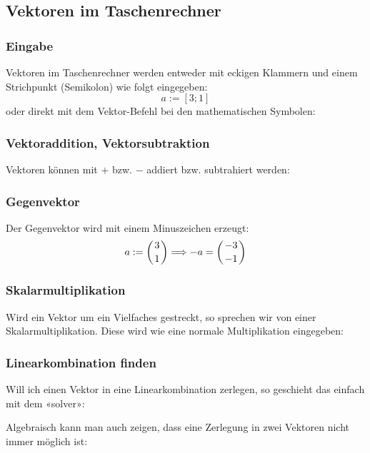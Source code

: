 \subsection{Vektoren im Taschenrechner}

\subsubsection{Eingabe}
Vektoren im Taschenrechner werden entweder mit eckigen Klammern und
einem Strichpunkt (Semikolon) wie folgt eingegeben:
$$a := [3; 1]$$
oder direkt mit dem Vektor-Befehl bei den mathematischen Symbolen:


\subsubsection{Vektoraddition, Vektorsubtraktion}
Vektoren können mit $+$ bzw. $-$ addiert bzw. subtrahiert
werden:

\subsubsection{Gegenvektor}
Der Gegenvektor wird mit einem Minuszeichen erzeugt:
$$a:=\left(3\atop 1\right) \Longrightarrow -a = \left( -3 \atop
-1\right)$$
\newpage

\subsubsection{Skalarmultiplikation}
Wird ein Vektor um ein Vielfaches gestreckt, so sprechen wir von einer
Skalarmultiplikation. Diese wird wie eine normale Multiplikation
eingegeben:


\subsubsection{Linearkombination finden}
Will ich einen Vektor in eine Linearkombination
 zerlegen, so geschieht das einfach mit dem
«solver»:
\newpage


Algebraisch kann man auch zeigen, dass eine Zerlegung in zwei Vektoren
nicht immer möglich ist:
